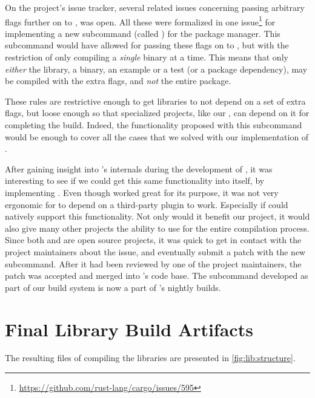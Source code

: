 On the {\cargo} project's issue tracker, several related issues concerning passing arbitrary flags further on to {\rustc}, was open.
All these were formalized in one issue\footnote{\url{https://github.com/rust-lang/cargo/issues/595}} for implementing a new subcommand (called ) for the package manager.
This subcommand would have allowed for passing these flags on to {\rustc}, but with the restriction of only compiling a \emph{single} binary at a time.
This means that only \emph{either} the library, a binary, an example or a test (or a package dependency), may be compiled with the extra flags, and \emph{not} the entire package.

These rules are restrictive enough to get libraries to not depend on a set of extra flags, but loose enough so that specialized projects, like our , can depend on it for completing the build.
Indeed, the functionality proposed with this subcommand would be enough to cover all the cases that we solved with our implementation of .

After gaining insight into {\cargo}'s internals during the development of , it was interesting to see if we could get this same functionality into {\cargo} itself, by implementing .
Even though  worked great for its purpose, it was not very ergonomic for {\rg} to depend on a third-party plugin to work.
Especially if {\cargo} could natively support this functionality.
Not only would it benefit our project, it would also give many other {\rust} projects the ability to use {\cargo} for the entire compilation process.
Since both {\rust} and {\cargo} are open source projects, it was quick to get in contact with the project maintainers about the issue, and eventually submit a patch with the new subcommand.
After it had been reviewed by one of the project maintainers, the patch was accepted and merged into {\cargo}'s code base.
The subcommand developed as part of our build system is now a part of {\rust}'s nightly builds.

\section{Final Library Build Artifacts}

The resulting files of compiling the libraries are presented in \autoref{fig:lib:structure}.

